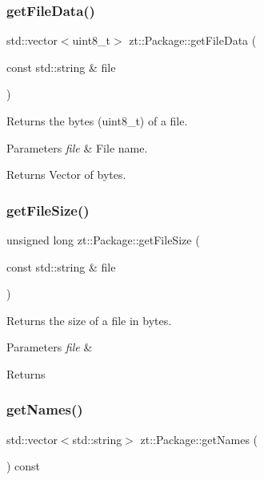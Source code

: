 \subsubsection{\texorpdfstring{get\+File\+Data()}{getFileData()}}
{\footnotesize\ttfamily std\+::vector$<$uint8\+\_\+t$>$ zt\+::\+Package\+::get\+File\+Data (\begin{DoxyParamCaption}\item[{const std\+::string \&}]{file }\end{DoxyParamCaption})}

Returns the bytes (uint8\+\_\+t) of a file. 
\begin{DoxyParams}{Parameters}
{\em file} & File name. \\
\hline
\end{DoxyParams}
\begin{DoxyReturn}{Returns}
Vector of bytes. 
\end{DoxyReturn}
\mbox{\label{classzt_1_1_package_a5c8234b81f3076072f5284a257bf0b51}} 
\subsubsection{\texorpdfstring{get\+File\+Size()}{getFileSize()}}
{\footnotesize\ttfamily unsigned long zt\+::\+Package\+::get\+File\+Size (\begin{DoxyParamCaption}\item[{const std\+::string \&}]{file }\end{DoxyParamCaption})}

Returns the size of a file in bytes. 
\begin{DoxyParams}{Parameters}
{\em file} & \\
\hline
\end{DoxyParams}
\begin{DoxyReturn}{Returns}

\end{DoxyReturn}
\mbox{\label{classzt_1_1_package_a9454a5a20192952e1d4d2c0ef9e434f4}} 
\subsubsection{\texorpdfstring{get\+Names()}{getNames()}}
{\footnotesize\ttfamily std\+::vector$<$std\+::string$>$ zt\+::\+Package\+::get\+Names (\begin{DoxyParamCaption}{ }\end{DoxyParamCaption}) const}

